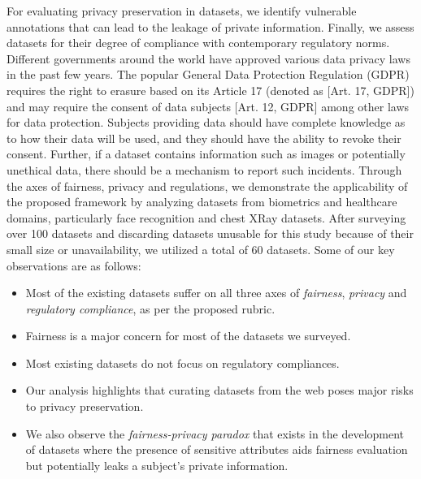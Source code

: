 \documentclass[journal]{IEEEtran}
\begin{document}
For evaluating privacy preservation in datasets, we identify vulnerable annotations that can lead to the leakage of private information. Finally, we assess datasets for their degree of compliance with contemporary regulatory norms. Different governments around the world have approved various data privacy laws in the past few years. The popular General Data Protection Regulation (GDPR)~\cite{regulation2016regulation} requires the right to erasure based on its Article 17 (denoted as [Art. 17, GDPR]) and may require the consent of data subjects [Art. 12, GDPR] among other laws for data protection. Subjects providing data should have complete knowledge as to how their data will be used, and they should have the ability to revoke their consent. Further, if a dataset contains information such as images or potentially unethical data, there should be a mechanism to report such incidents. %
Through the axes of fairness, privacy and regulations, we demonstrate the applicability of the proposed framework by analyzing datasets from biometrics and healthcare domains, particularly face recognition and chest XRay datasets. After surveying over 100 datasets and discarding datasets unusable for this study
because of their small size or unavailability, we utilized a total of 60 datasets. Some of our key observations are as follows: 
\begin{itemize}
    \item Most of the existing datasets suffer on all three axes of \textit{fairness}, \textit{privacy} and \textit{regulatory compliance}, as per the proposed rubric. 
    \item Fairness is a major concern for most of the datasets we surveyed.
    \item Most existing datasets do not focus on regulatory compliances.
    \item Our analysis highlights that curating datasets from the web poses major risks to privacy preservation.
    \item  We also observe the \textit{fairness-privacy paradox} that exists in the development of datasets where the presence of sensitive attributes aids fairness evaluation but potentially leaks a subject’s private information.
\end{itemize}
\end{document}
